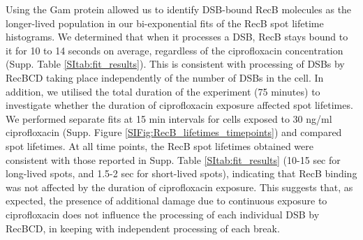 Using the Gam protein allowed us to identify DSB-bound RecB molecules as the longer-lived population in our bi-exponential fits of the RecB spot lifetime histograms. We determined that when it processes a DSB, RecB stays bound to it for 10 to 14 seconds on average, regardless of the ciprofloxacin concentration (Supp. Table \ref{SItab:fit_results}). This is consistent with processing of DSBs by RecBCD taking place independently of the number of DSBs in the cell. In addition, we utilised the total duration of the experiment (75 minutes) to investigate whether the duration of ciprofloxacin exposure affected spot lifetimes. We performed separate fits at 15 min intervals for cells exposed to 30 ng/ml ciprofloxacin (Supp. Figure \ref{SIFig:RecB_lifetimes_timepoints}) and compared spot lifetimes. At all time points, the RecB spot lifetimes obtained were consistent with those reported in Supp. Table \ref{SItab:fit_results} (10-15 sec for long-lived spots, and 1.5-2 sec for short-lived spots), indicating that RecB binding was not affected by the duration of ciprofloxacin exposure. This suggests that, as expected, the presence of additional damage due to continuous exposure to ciprofloxacin does not influence the processing of each individual DSB by RecBCD, in keeping with independent processing of each break.

